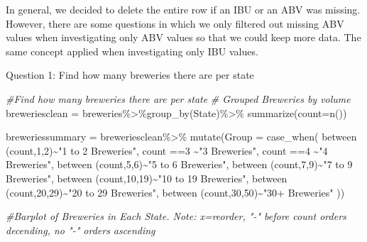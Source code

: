 \documentclass[
]{article}
\newenvironment{Shaded}{\begin{snugshade}}{\end{snugshade}}
\newcommand{\AttributeTok}[1]{\textcolor[rgb]{0.77,0.63,0.00}{#1}}
\newcommand{\CommentTok}[1]{\textcolor[rgb]{0.56,0.35,0.01}{\textit{#1}}}
\newcommand{\DecValTok}[1]{\textcolor[rgb]{0.00,0.00,0.81}{#1}}
\newcommand{\FunctionTok}[1]{\textcolor[rgb]{0.00,0.00,0.00}{#1}}
\newcommand{\NormalTok}[1]{#1}
\newcommand{\OtherTok}[1]{\textcolor[rgb]{0.56,0.35,0.01}{#1}}
\newcommand{\SpecialCharTok}[1]{\textcolor[rgb]{0.00,0.00,0.00}{#1}}
\newcommand{\StringTok}[1]{\textcolor[rgb]{0.31,0.60,0.02}{#1}}
\begin{document}
In general, we decided to delete the entire row if an IBU or an ABV was
missing. However, there are some questions in which we only filtered out
missing ABV values when investigating only ABV values so that we could
keep more data. The same concept applied when investigating only IBU
values.

Question 1: Find how many breweries there are per state

\begin{Shaded}
\begin{Highlighting}[]
\CommentTok{\#Find how many breweries there are per state}
\CommentTok{\# Grouped Breweries by volume}
\NormalTok{breweriesclean }\OtherTok{=}\NormalTok{ breweries}\SpecialCharTok{\%\textgreater{}\%}\FunctionTok{group\_by}\NormalTok{(State)}\SpecialCharTok{\%\textgreater{}\%}
  \FunctionTok{summarize}\NormalTok{(}\AttributeTok{count=}\FunctionTok{n}\NormalTok{())}

\NormalTok{breweriessummary }\OtherTok{=}\NormalTok{ breweriesclean}\SpecialCharTok{\%\textgreater{}\%} 
  \FunctionTok{mutate}\NormalTok{(}\AttributeTok{Group =} \FunctionTok{case\_when}\NormalTok{(}
    \FunctionTok{between}\NormalTok{ (count,}\DecValTok{1}\NormalTok{,}\DecValTok{2}\NormalTok{)}\SpecialCharTok{\textasciitilde{}}\StringTok{"1 to 2 Breweries"}\NormalTok{,}
\NormalTok{    count }\SpecialCharTok{==}\DecValTok{3} \SpecialCharTok{\textasciitilde{}}\StringTok{"3 Breweries"}\NormalTok{,}
\NormalTok{    count }\SpecialCharTok{==}\DecValTok{4} \SpecialCharTok{\textasciitilde{}}\StringTok{"4 Breweries"}\NormalTok{,}
    \FunctionTok{between}\NormalTok{ (count,}\DecValTok{5}\NormalTok{,}\DecValTok{6}\NormalTok{)}\SpecialCharTok{\textasciitilde{}}\StringTok{"5 to 6 Breweries"}\NormalTok{,}
    \FunctionTok{between}\NormalTok{ (count,}\DecValTok{7}\NormalTok{,}\DecValTok{9}\NormalTok{)}\SpecialCharTok{\textasciitilde{}}\StringTok{"7 to 9 Breweries"}\NormalTok{,}
    \FunctionTok{between}\NormalTok{ (count,}\DecValTok{10}\NormalTok{,}\DecValTok{19}\NormalTok{)}\SpecialCharTok{\textasciitilde{}}\StringTok{"10 to 19 Breweries"}\NormalTok{,}
    \FunctionTok{between}\NormalTok{ (count,}\DecValTok{20}\NormalTok{,}\DecValTok{29}\NormalTok{)}\SpecialCharTok{\textasciitilde{}}\StringTok{"20 to 29 Breweries"}\NormalTok{,}
    \FunctionTok{between}\NormalTok{ (count,}\DecValTok{30}\NormalTok{,}\DecValTok{50}\NormalTok{)}\SpecialCharTok{\textasciitilde{}}\StringTok{"30+ Breweries"}
\NormalTok{  ))}


\CommentTok{\#Barplot of Breweries in Each State.  Note: x=reorder, "{-}" before count orders decending, no "{-}" orders ascending}


\end{Highlighting}
\end{Shaded}
\end{document}

